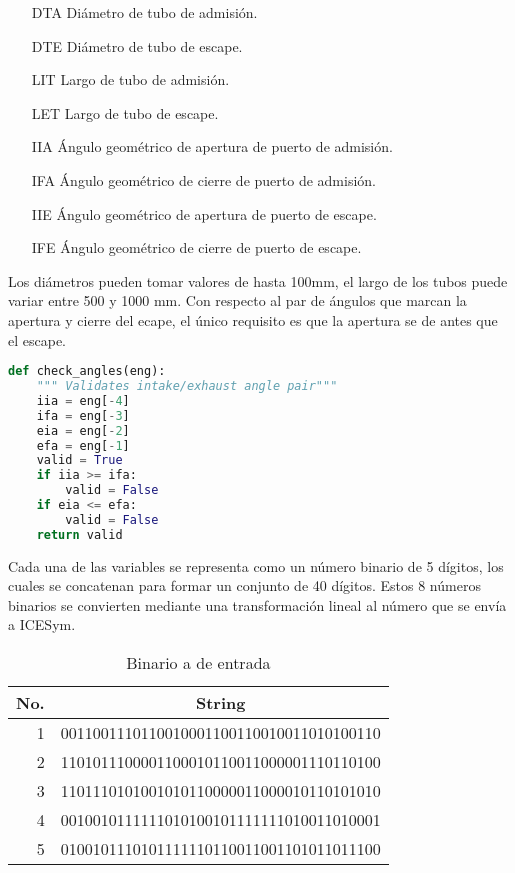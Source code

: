 \begin{enumerate}
    \item [DTA] Diámetro de tubo de admisión.
    \item [DTE] Diámetro de tubo de escape.
    \item [LIT] Largo de tubo de admisión.
    \item [LET] Largo de tubo de escape.
    \item [IIA] Ángulo geométrico de apertura de puerto de admisión.
    \item [IFA] Ángulo geométrico de cierre de puerto de admisión.
    \item [IIE] Ángulo geométrico de apertura de puerto de escape.
    \item [IFE] Ángulo geométrico de cierre de puerto de escape.
\end{enumerate}

Los diámetros pueden tomar valores de hasta 100mm, el largo de los tubos puede
variar entre 500 y 1000 mm.
%
Con respecto al par de ángulos que marcan la apertura y cierre del ecape,
el único requisito es que la apertura se de antes que el escape.

\begin{lstlisting}[language=Python]
def check_angles(eng):
    """ Validates intake/exhaust angle pair"""
    iia = eng[-4]
    ifa = eng[-3]
    eia = eng[-2]
    efa = eng[-1]
    valid = True
    if iia >= ifa:
        valid = False
    if eia <= efa:
        valid = False
    return valid
\end{lstlisting}

Cada una de las variables se representa como un número binario de 5 dígitos,
los cuales se concatenan para formar un conjunto de 40 dígitos.
%
Estos 8 números binarios se convierten mediante una transformación lineal
al número que se envía a ICESym.

\begin{table}
    \centering
        \begin{tabular}{rc} \toprule
            No. & String                                   \\ \midrule
            1   & 0011001110110010001100110010011010100110 \\
            2   & 1101011100001100010110011000001110110100 \\
            3   & 1101110101001010110000011000010110101010 \\
            4   & 0010010111111010100101111111010011010001 \\
            5   & 0100101110101111110110011001101011011100 \\ \bottomrule
        \end{tabular}
    \caption{Binario a de entrada}\label{tab:mapeo_pre}
\end{table}

